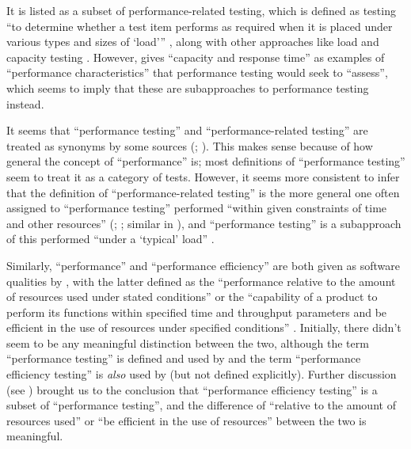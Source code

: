 It is listed as a subset of performance-related testing, which is defined as
testing ``to determine whether a test item performs as required when it is
placed under various types and sizes of `load''' \citeyearpar[p.~38]{IEEE2021},
along with other approaches like load and capacity testing
\citep[p.~22]{IEEE2022}. However, \citet[p.~5-9]{SWEBOK2024}
gives ``capacity and response time'' as examples of ``performance
characteristics'' that performance testing would seek to ``assess'', which
seems to imply that these are subapproaches to performance testing instead.

It seems that ``performance testing'' and ``performance-related testing''
are treated as synonyms by some sources (\citealp[p.~5-9]{SWEBOK2024};
\citealp[p.~1187]{Moghadam2019}). This makes sense because of how general the
concept of ``performance'' is; most definitions of ``performance testing'' seem
to treat it as a category of tests. However, it seems more consistent to infer
that the definition of ``performance-related testing'' is the more general one
often assigned to ``performance testing'' performed ``within given constraints
of time and other resources'' (\citealp[p.~7]{IEEE2022};
\citeyear[p.~320]{IEEE2017}; similar in \citealp[p.~1187]{Moghadam2019}), and
``performance testing'' is a subapproach of this performed ``under a `typical'
load'' \citep[p.~39]{IEEE2021}.

Similarly, ``performance'' and ``performance efficiency'' are
both given as software qualities by \citeauthor{IEEE2017}, with the latter
defined as the ``performance relative to the amount
of resources used under stated conditions'' \citeyearpar[p.~319]{IEEE2017}
or the ``capability of a product to perform its functions within specified
time and throughput parameters and be efficient in the use of resources under
specified conditions'' \citep{ISO_IEC2023a}.
Initially, there didn't seem to be any meaningful distinction
between the two, although the term ``performance testing'' is defined
\citeyearpar[p.~320]{IEEE2017} and used by \citeauthor{IEEE2017} and
the term ``performance efficiency testing'' is \emph{also} used by
\citeauthor{IEEE2017} (but not defined explicitly). Further discussion (see
) brought us to the conclusion that ``performance
efficiency testing'' is a subset of ``performance testing'', and the
difference of ``relative to the amount of resources used'' or ``be efficient in
the use of resources'' between the two is meaningful.

